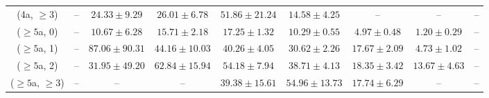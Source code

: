 \begin{table}[h!]
{\begin{tabular}{ccccccccc}
	(4a, $\ge3$) & -- & $24.33\pm 9.29$ & $26.01\pm 6.78$ & $51.86\pm 21.24$ & $14.58\pm 4.25$ & -- & -- & -- \\[0.5ex] 
	($\ge5$a, 0) & -- & $10.67\pm 6.28$ & $15.71\pm 2.18$ & $17.25\pm 1.32$ & $10.29\pm 0.55$ & $4.97\pm 0.48$ & $1.20\pm 0.29$ & -- \\[0.5ex] 
	($\ge5$a, 1) & -- & $87.06\pm 90.31$ & $44.16\pm 10.03$ & $40.26\pm 4.05$ & $30.62\pm 2.26$ & $17.67\pm 2.09$ & $4.73\pm 1.02$ & -- \\[0.5ex] 
	($\ge5$a, 2) & -- & $31.95\pm 49.20$ & $62.84\pm 15.94$ & $54.18\pm 7.94$ & $38.71\pm 4.13$ & $18.35\pm 3.42$ & $13.67\pm 4.63$ & -- \\[0.5ex] 
	($\ge5$a, $\ge3$) & -- & -- & -- & $39.38\pm 15.61$ & $54.96\pm 13.73$ & $17.74\pm 6.29$ & -- & -- \\[0.5ex] 
	\hline
	\hline
\end{tabular}}
\end{table}
